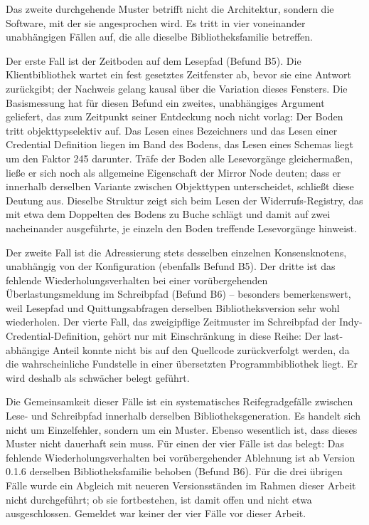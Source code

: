 Das zweite durchgehende Muster betrifft nicht die Architektur, sondern die Software, mit der sie angesprochen wird. Es tritt in vier voneinander unabhängigen Fällen auf, die alle dieselbe Bibliotheksfamilie betreffen.

Der erste Fall ist der Zeitboden auf dem Lesepfad (Befund B5). Die Klientbibliothek wartet ein fest gesetztes Zeitfenster ab, bevor sie eine Antwort zurückgibt; der Nachweis gelang kausal über die Variation dieses Fensters. Die Basismessung hat für diesen Befund ein zweites, unabhängiges Argument geliefert, das zum Zeitpunkt seiner Entdeckung noch nicht vorlag: Der Boden tritt objekttypselektiv auf. Das Lesen eines Bezeichners und das Lesen einer Credential Definition liegen im Band des Bodens, das Lesen eines Schemas liegt um den Faktor 245 darunter. Träfe der Boden alle Lesevorgänge gleichermaßen, ließe er sich noch als allgemeine Eigenschaft der Mirror Node deuten; dass er innerhalb derselben Variante zwischen Objekttypen unterscheidet, schließt diese Deutung aus. Dieselbe Struktur zeigt sich beim Lesen der Widerrufs-Registry, das mit etwa dem Doppelten des Bodens zu Buche schlägt und damit auf zwei nacheinander ausgeführte, je einzeln den Boden treffende Lesevorgänge hinweist.

Der zweite Fall ist die Adressierung stets desselben einzelnen Konsensknotens, unabhängig von der Konfiguration (ebenfalls Befund B5). Der dritte ist das fehlende Wiederholungsverhalten bei einer vorübergehenden Überlastungsmeldung im Schreibpfad (Befund B6) -- besonders bemerkenswert, weil Lesepfad und Quittungsabfragen derselben Bibliotheksversion sehr wohl wiederholen. Der vierte Fall, das zweigipflige Zeitmuster im Schreibpfad der Indy-Credential-Definition, gehört nur mit Einschränkung in diese Reihe: Der last-abhängige Anteil konnte nicht bis auf den Quellcode zurückverfolgt werden, da die wahrscheinliche Fundstelle in einer übersetzten Programmbibliothek liegt. Er wird deshalb als schwächer belegt geführt.

Die Gemeinsamkeit dieser Fälle ist ein systematisches Reifegradgefälle zwischen Lese- und Schreibpfad innerhalb derselben Bibliotheksgeneration. Es handelt sich nicht um Einzelfehler, sondern um ein Muster. Ebenso wesentlich ist, dass dieses Muster nicht dauerhaft sein muss. Für einen der vier Fälle ist das belegt: Das fehlende Wiederholungsverhalten bei vorübergehender Ablehnung ist ab Version 0.1.6 derselben Bibliotheksfamilie behoben (Befund B6). Für die drei übrigen Fälle wurde ein Abgleich mit neueren Versionsständen im Rahmen dieser Arbeit nicht durchgeführt; ob sie fortbestehen, ist damit offen und nicht etwa ausgeschlossen. Gemeldet war keiner der vier Fälle vor dieser Arbeit.

